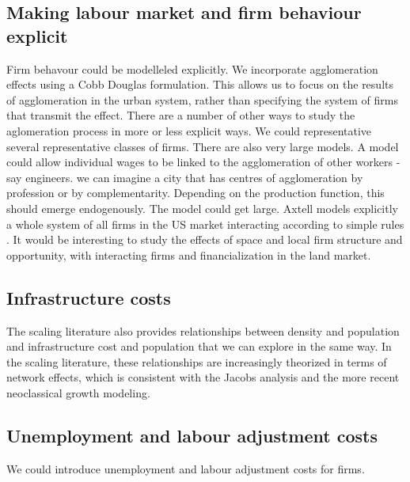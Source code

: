 \subsection{Making labour market and firm behaviour explicit}

Firm behavour could be modelleled explicitly. We incorporate agglomeration effects using a Cobb Douglas formulation. This allows us to focus on the results of agglomeration in the urban system, rather than specifying the system of firms that transmit the effect. 
There are a number of other ways to study the aglomeration process in more or less explicit ways. We could representative several representative classes of firms. There are also very large models. 
A  model could allow individual wages to be linked to the agglomeration of other workers - say engineers. we can imagine a city that has centres of agglomeration by profession or by complementarity. Depending on the production function, this should emerge endogenously. The model could get large. Axtell models explicitly a whole system of all firms in the US market interacting according to simple rules \cite{axtellDynamicsFirmsData2024}. It would be interesting to study the effects of space and local firm structure and opportunity, with interacting firms and financialization in the land market. 

\subsection{Infrastructure costs}
The scaling literature also provides relationships between density and population and infrastructure cost and population that we can explore in the same way. In the scaling literature, these relationships are increasingly theorized in terms of network effects, which is consistent with the Jacobs analysis and the more recent neoclassical growth modeling.


\subsection{Unemployment and labour adjustment costs}

We could introduce unemployment and \glspl{labour adjustment cost} for firms. %

